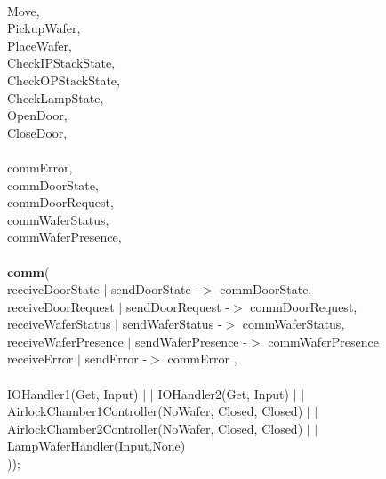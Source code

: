 \documentclass[a4paper,12pt]{article}
\begin{document}
	\\						{Move,
		\\ 				 	 PickupWafer,
		\\				 		 PlaceWafer,
		\\	    			 CheckIPStackState,
		\\	  				 CheckOPStackState,
		\\						 CheckLampState,
		\\						 OpenDoor,
		\\						 CloseDoor,
		\\
		\\                       commError,	
		\\						 commDoorState,
		\\						 commDoorRequest,
		\\						 commWaferStatus,
		\\						 commWaferPresence},
	\\
	\\\textbf{			comm}(
	\\						{receiveDoorState $|$ sendDoorState -$>$ commDoorState,
		\\						receiveDoorRequest $|$ sendDoorRequest -$>$ commDoorRequest,
		\\	  				 	receiveWaferStatus $|$ sendWaferStatus -$>$ commWaferStatus,
		\\				 	   receiveWaferPresence $|$ sendWaferPresence -$>$ commWaferPresence
		\\ receiveError $|$ sendError -$>$ commError },
	\\
	\\						 IOHandler1(Get, Input) $|$ $|$ IOHandler2(Get, Input) $|$ $|$ AirlockChamber1Controller(NoWafer, Closed, Closed) $|$ $|$ AirlockChamber2Controller(NoWafer, Closed, Closed) $|$ $|$ LampWaferHandler(Input,None)
	\\					 ));
	\newpage
\end{document}
